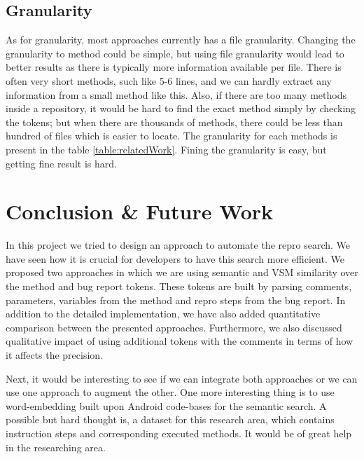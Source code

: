 \documentclass[sigconf]{acmart}
\begin{document}
\subsection{Granularity}
As for granularity, most approaches currently has a file granularity. Changing the granularity to method could be simple, but using file granularity would lead to better results as there is typically more information available per file. There is often very short methods, such like 5-6 lines, and we can hardly extract any information from a small method like this. Also, if there are too many methods inside a repository, it would be hard to find the exact method simply by checking the tokens; but when there are thousands of methods, there could be less than hundred of files which is easier to locate. The granularity for each methods is present in the table \ref{table:relatedWork}. Fining the granularity is easy, but getting fine result is hard.












\section{Conclusion \& Future Work}
In this project we tried to design an approach to automate the repro search. We have seen how it is crucial for developers to have this search more efficient. We proposed two approaches in which we are using semantic and VSM similarity over the method and bug report tokens. These tokens are built by parsing comments, parameters, variables from the method and repro steps from the bug report. In addition to the detailed implementation, we have also added quantitative comparison between the presented approaches. Furthermore, we also discussed qualitative impact of using additional tokens with the comments in terms of how it affects the precision.

Next, it would be interesting to see if we can integrate both approaches or we can use one approach to augment the other. One more interesting thing is to use word-embedding built upon Android code-bases for the semantic search. A possible but hard thought is, a dataset for this research area, which contains instruction steps and corresponding executed methods. It would be of great help in the researching area.








\appendix
\end{document}
